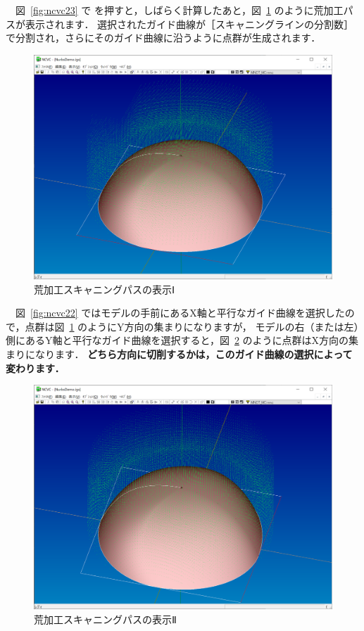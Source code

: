 　図~\ref{fig:ncvc23} で  を押すと，しばらく計算したあと，図~\ref{fig:ncvc24} のように荒加工パスが表示されます．
選択されたガイド曲線が［スキャニングラインの分割数］で分割され，さらにそのガイド曲線に沿うように点群が生成されます．

\begin{figure}[H]
\centering
\includegraphics[scale=0.5]{No2/fig/fig24.png}
\caption{荒加工スキャニングパスの表示Ⅰ}
\label{fig:ncvc24}
\end{figure}

　図~\ref{fig:ncvc22} ではモデルの手前にあるX軸と平行なガイド曲線を選択したので，点群は図~\ref{fig:ncvc24} のようにY方向の集まりになりますが，
モデルの右（または左）側にあるY軸と平行なガイド曲線を選択すると，図~\ref{fig:ncvc25} のように点群はX方向の集まりになります．
\textbf{どちら方向に切削するかは，このガイド曲線の選択によって変わります．}

\begin{figure}[H]
\centering
\includegraphics[scale=0.5]{No2/fig/fig25.png}
\caption{荒加工スキャニングパスの表示Ⅱ}
\label{fig:ncvc25}
\end{figure}

